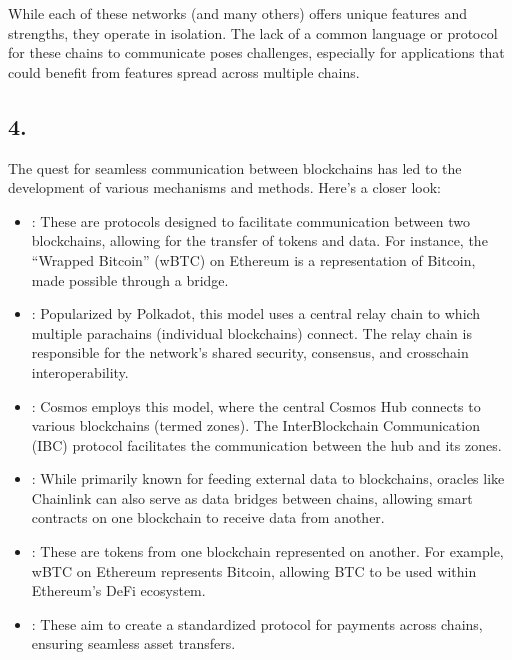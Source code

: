 \documentclass[letterpaper,10pt,english]{jupyterBook}
\begin{document}
\sphinxAtStartPar
While each of these networks (and many others) offers unique features and strengths, they operate in isolation. The lack of a common language or protocol for these chains to communicate poses challenges, especially for applications that could benefit from features spread across multiple chains.


\subsection{4. }
\label{\detokenize{Interoperability/Cross-Chain Interoperability:mechanisms-and-methods-for-interoperability}}
\sphinxAtStartPar
The quest for seamless communication between blockchains has led to the development of various mechanisms and methods. Here’s a closer look:
\begin{itemize}
\item {} 
\sphinxAtStartPar
{}: These are protocols designed to facilitate communication between two blockchains, allowing for the transfer of tokens and data. For instance, the “Wrapped Bitcoin” (wBTC) on Ethereum is a representation of Bitcoin, made possible through a bridge.

\item {} 
\sphinxAtStartPar
{}: Popularized by Polkadot, this model uses a central relay chain to which multiple parachains (individual blockchains) connect. The relay chain is responsible for the network’s shared security, consensus, and cross\sphinxhyphen{}chain interoperability.

\item {} 
\sphinxAtStartPar
{}: Cosmos employs this model, where the central Cosmos Hub connects to various blockchains (termed zones). The Inter\sphinxhyphen{}Blockchain Communication (IBC) protocol facilitates the communication between the hub and its zones.

\item {} 
\sphinxAtStartPar
{}: While primarily known for feeding external data to blockchains, oracles like Chainlink can also serve as data bridges between chains, allowing smart contracts on one blockchain to receive data from another.

\item {} 
\sphinxAtStartPar
{}: These are tokens from one blockchain represented on another. For example, wBTC on Ethereum represents Bitcoin, allowing BTC to be used within Ethereum’s DeFi ecosystem.

\item {} 
\sphinxAtStartPar
{}: These aim to create a standardized protocol for payments across chains, ensuring seamless asset transfers.

\end{itemize}
\end{document}
